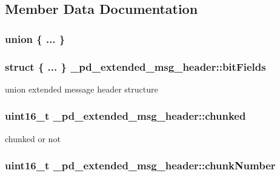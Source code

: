 \subsection{Member Data Documentation}
\hypertarget{struct__pd__extended__msg__header_adabc87126ff956865d96e9a2964e057d}{\subsubsection[{"@47}]{\setlength{\rightskip}{0pt plus 5cm}union \{ ... \} }}\label{struct__pd__extended__msg__header_adabc87126ff956865d96e9a2964e057d}
\hypertarget{struct__pd__extended__msg__header_aac756f1b65823f59184919281e17c0ce}{
\subsubsection[{bit\-Fields}]{\setlength{\rightskip}{0pt plus 5cm}struct \{ ... \}   \-\_\-pd\-\_\-extended\-\_\-msg\-\_\-header\-::bit\-Fields}}\label{struct__pd__extended__msg__header_aac756f1b65823f59184919281e17c0ce}
union extended message header structure \hypertarget{struct__pd__extended__msg__header_a7ddec1cf6746143e515ead70b6cbc854}{
\subsubsection[{chunked}]{\setlength{\rightskip}{0pt plus 5cm}uint16\-\_\-t \-\_\-pd\-\_\-extended\-\_\-msg\-\_\-header\-::chunked}}\label{struct__pd__extended__msg__header_a7ddec1cf6746143e515ead70b6cbc854}
chunked or not \hypertarget{struct__pd__extended__msg__header_a7d9849b0fd8f87888a54bca2df9c1aa5}{
\subsubsection[{chunk\-Number}]{\setlength{\rightskip}{0pt plus 5cm}uint16\-\_\-t \-\_\-pd\-\_\-extended\-\_\-msg\-\_\-header\-::chunk\-Number}}\label{struct__pd__extended__msg__header_a7d9849b0fd8f87888a54bca2df9c1aa5}
